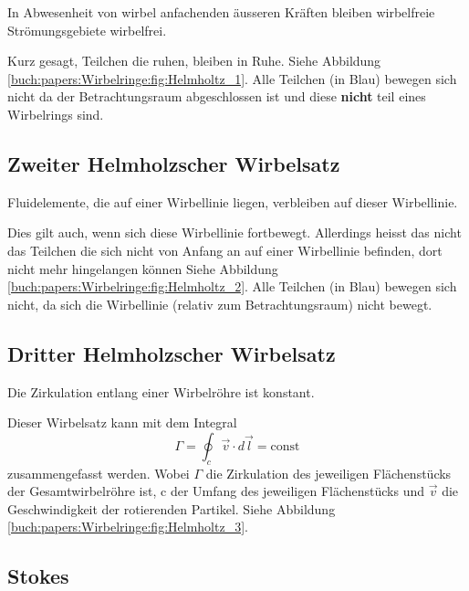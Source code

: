 \begin{displayquote}
    In Abwesenheit von wirbel anfachenden äusseren Kräften bleiben wirbelfreie Strömungsgebiete wirbelfrei.
\end{displayquote}

Kurz gesagt, Teilchen die ruhen, bleiben in Ruhe. 
Siehe Abbildung \ref{buch:papers:Wirbelringe:fig:Helmholtz_1}. 
Alle Teilchen (in Blau) bewegen sich nicht da der Betrachtungsraum abgeschlossen ist und diese \textbf{nicht} teil eines Wirbelrings sind.

\subsection{Zweiter Helmholzscher Wirbelsatz}

\begin{displayquote}
    Fluidelemente, die auf einer Wirbellinie liegen, verbleiben auf dieser Wirbellinie.
\end{displayquote}

Dies gilt auch, wenn sich diese Wirbellinie fortbewegt. 
Allerdings heisst das nicht das Teilchen die sich nicht von Anfang an auf einer Wirbellinie befinden, dort nicht mehr hingelangen können  
Siehe Abbildung \ref{buch:papers:Wirbelringe:fig:Helmholtz_2}. 
Alle Teilchen (in Blau) bewegen sich nicht, da sich die Wirbellinie (relativ zum Betrachtungsraum) nicht bewegt.

\subsection{Dritter Helmholzscher Wirbelsatz}

\begin{displayquote}
    Die Zirkulation entlang einer Wirbelröhre ist konstant. 
\end{displayquote}

Dieser Wirbelsatz kann mit dem Integral 
\[
\Gamma
= 
\oint_{c} \vec{v} \cdot d \vec{l}
=
\text{const}
\]
zusammengefasst werden. 
Wobei \(\Gamma\) die Zirkulation des jeweiligen Flächenstücks der Gesamtwirbelröhre ist, c der Umfang des jeweiligen Flächenstücks und \(\vec{v}\) die Geschwindigkeit der rotierenden Partikel. 
Siehe Abbildung \ref{buch:papers:Wirbelringe:fig:Helmholtz_3}. 


\subsection{Stokes \label{paper:Wirbelringe:Stokes}}


